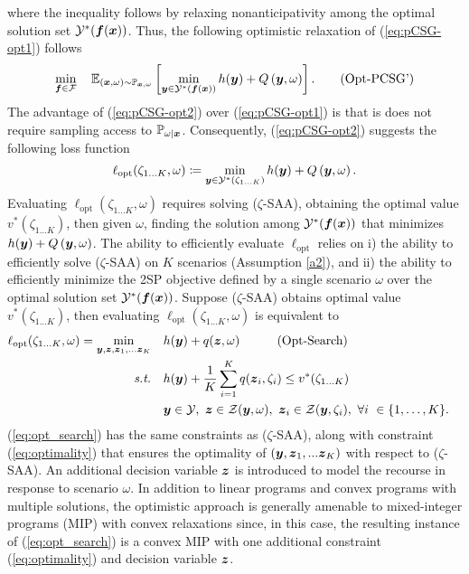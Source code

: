 where the inequality follows by relaxing nonanticipativity among the optimal solution set $\mathcal{Y}^*(\boldsymbol{f}(\boldsymbol{x}))$. Thus, the following optimistic relaxation of (\ref{eq:pCSG-opt1}) follows
\begin{equation}\label{eq:pCSG-opt2}
    \min_{\boldsymbol{f} \in \mathcal{F}} \quad   \mathbb{E}_{(\boldsymbol{x}, \omega) \sim \mathbb{P}_{\boldsymbol{x}, \omega}} \left[
    \min_{\boldsymbol{y} \in \mathcal{Y}^*(\boldsymbol{f}(\boldsymbol{x}))} h(\boldsymbol{y}) + Q \left(\boldsymbol{y}, \omega \right) \right]. \tag{Opt-PCSG'}
\end{equation} 
The advantage of (\ref{eq:pCSG-opt2}) over (\ref{eq:pCSG-opt1}) is that is does not require sampling access to $\mathbb{P}_{\omega|\boldsymbol{x}}$. Consequently, (\ref{eq:pCSG-opt2}) suggests the following loss function
$$\ell_{\text{opt}}(\zeta_{1...K}, \omega) \coloneq \min_{\boldsymbol{y} \in \mathcal{Y}^*(\zeta_{1 \hdots K})} h(\boldsymbol{y}) + Q \left(\boldsymbol{y}, \omega \right).$$ 
Evaluating $\ell_{\text{opt}}(\zeta_{1...K}, \omega)$ requires solving ($\zeta$-SAA), obtaining the optimal value $v^*(\zeta_{1 \hdots K})$, then given $\omega$, finding the solution among $\mathcal{Y}^*(\boldsymbol{f}(\boldsymbol{x}))$ that minimizes $h(\boldsymbol{y}) + Q \left(\boldsymbol{y}, \omega \right)$. The ability to efficiently evaluate $\ell_{\text{opt}}$ relies on i) the ability to efficiently solve \hbox{($\zeta$-SAA)} on $K$ scenarios (Assumption \ref{a2}), and ii) the ability to efficiently minimize the 2SP objective defined by a single scenario $\omega$ over the optimal solution set $\mathcal{Y}^*(\boldsymbol{f}(\boldsymbol{x}))$. Suppose \hbox{($\zeta$-SAA)} obtains optimal value $v^*(\zeta_{1 \hdots K})$, then evaluating $\ell_{\text{opt}}(\zeta_{1...K}, \omega)$ is equivalent to
  \begin{align}\label{eq:opt_search}
  \ell_{\text{opt}}(\zeta_{1 \hdots K}, \omega ) = \min_{\boldsymbol{y}, \boldsymbol{z}, \boldsymbol{z}_1, ... \boldsymbol{z}_K} \quad & h( \boldsymbol{y})+q(\boldsymbol{z}, \omega) \quad  \tag{Opt-Search} \\ \textit{s.t.}  
 \quad & h( \boldsymbol{y}) + \frac{1}{K}\sum_{i = 1}^K  q(\boldsymbol{z}_i, \zeta_i) \leq v^*(\zeta_{1\hdots K}) & \label{eq:optimality} \\
 \quad & \boldsymbol{y} \in \mathcal{Y},\ \boldsymbol{z} \in \mathcal{Z}(\boldsymbol{y}, \omega),\  \boldsymbol{z}_i \in \mathcal{Z}(\boldsymbol{y}, \zeta_i), \ \forall i\  \in \{1,\hdots ,K\}.\nonumber
  \end{align} 
(\ref{eq:opt_search}) has the same constraints as \hbox{($\zeta$-SAA)}, along with constraint (\ref{eq:optimality}) that ensures the optimality of $(\boldsymbol{y}, \boldsymbol{z}_1, ... \boldsymbol{z}_K)$ with respect to \hbox{($\zeta$-SAA)}. An additional decision variable $\boldsymbol{z}$ is introduced to model the recourse in response to scenario $\omega$. In addition to linear programs and convex programs with multiple solutions, the optimistic approach is generally amenable to mixed-integer programs (MIP) with convex relaxations since, in this case, the resulting instance of (\ref{eq:opt_search}) is a convex MIP with one additional constraint (\ref{eq:optimality}) and decision variable $\boldsymbol{z}$.

